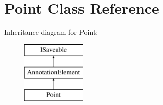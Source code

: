 \hypertarget{class_point}{}\section{Point Class Reference}
\label{class_point}
Inheritance diagram for Point\+:\begin{figure}[H]
\begin{center}
\leavevmode
\includegraphics[height=3.000000cm]{class_point}
\end{center}
\end{figure}
